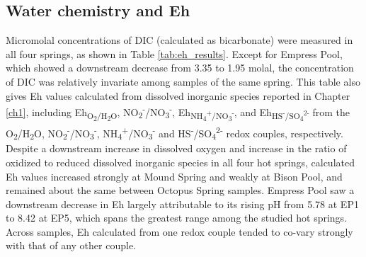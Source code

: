 \subsection{Water chemistry and Eh}

Micromolal concentrations of DIC (calculated as bicarbonate) were measured in all four springs, as shown in Table \ref{tab:eh_results}. Except for Empress Pool, which showed a downstream decrease from 3.35 to 1.95 molal, the concentration of DIC was relatively invariate among samples of the same spring. This table also gives Eh values calculated from dissolved inorganic species reported in Chapter \ref{ch1}, including Eh\textsubscript{O\textsubscript{2}/H\textsubscript{2}O},
NO\textsubscript{2}\textsuperscript{-}/NO\textsubscript{3}\textsuperscript{-}, Eh\textsubscript{NH\textsubscript{4}\textsuperscript{+}/NO\textsubscript{3}\textsuperscript{-}}, and Eh\textsubscript{HS\textsuperscript{-}/SO\textsubscript{4}\textsuperscript{2-}} from the O\textsubscript{2}/H\textsubscript{2}O, NO\textsubscript{2}\textsuperscript{-}/NO\textsubscript{3}\textsuperscript{-}, NH\textsubscript{4}\textsuperscript{+}/NO\textsubscript{3}\textsuperscript{-} and HS\textsuperscript{-}/SO\textsubscript{4}\textsuperscript{2-} redox couples, respectively. Despite a downstream increase in dissolved oxygen and increase in the ratio of oxidized to reduced dissolved inorganic species in all four hot springs, calculated Eh values increased strongly at Mound Spring and weakly at Bison Pool, and remained about the same between Octopus Spring samples. Empress Pool saw a downstream decrease in Eh largely attributable to its rising pH from 5.78 at EP1 to 8.42 at EP5, which spans the greatest range among the studied hot springs. Across samples, Eh calculated from one redox couple tended to co-vary strongly with that of any other couple.







